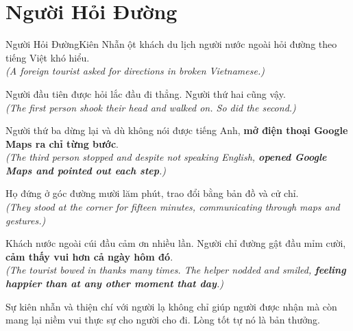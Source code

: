 \section{Người Hỏi Đường}
\begin{truyen}{Người Hỏi Đường}{Kiên Nhẫn}
ột khách du lịch người nước ngoài hỏi đường theo tiếng Việt khó hiểu.\\
\textit{(A foreign tourist asked for directions in broken Vietnamese.)}

Người đầu tiên được hỏi lắc đầu đi thẳng. Người thứ hai cũng vậy.\\
\textit{(The first person shook their head and walked on. So did the second.)}

Người thứ ba dừng lại và dù không nói được tiếng Anh, \textbf{mở điện thoại Google Maps ra chỉ từng bước}.\\
\textit{(The third person stopped and despite not speaking English, \textbf{opened Google Maps and pointed out each step}.)}

Họ đứng ở góc đường mười lăm phút, trao đổi bằng bản đồ và cử chỉ.\\
\textit{(They stood at the corner for fifteen minutes, communicating through maps and gestures.)}

Khách nước ngoài cúi đầu cảm ơn nhiều lần. Người chỉ đường gật đầu mỉm cười, \textbf{cảm thấy vui hơn cả ngày hôm đó}.\\
\textit{(The tourist bowed in thanks many times. The helper nodded and smiled, \textbf{feeling happier than at any other moment that day}.)}
\end{truyen}
\begin{baihoc}
  Sự kiên nhẫn và thiện chí với người lạ không chỉ giúp người được nhận mà còn mang lại niềm vui thực sự cho người cho đi. Lòng tốt tự nó là bản thưởng.
\end{baihoc}

